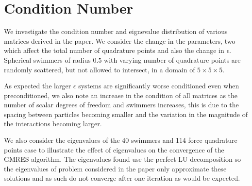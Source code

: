 \newpage
\FloatBarrier
\section{Condition Number}\label{appendix:ConNum}
We investigate the condition number and eignevalue distribution of various matrices derived in the paper. We consider the change in the parameters, two which affect the total number of quadrature points and also the change in $\epsilon$. Spherical swimmers of radius $0.5$ with varying number of quadrature points are randomly scattered, but not allowed to intersect, in a domain of $5 \times 5 \times 5$. 

As expected the larger $\epsilon$ systems are significantly worse conditioned even when preconditioned, we also note an increase in the condition of all matrices as the number of scalar degrees of freedom and swimmers increases, this is due to the spacing between particles becoming smaller and the variation in the magnitude of the interactions becoming larger. 

We also consider the eigenvalues of the 40 swimmers and 114 force quadrature points case to illustrate the effect of eigenvalues on the convergence of the GMRES algorithm. The eigenvalues found use the perfect LU decomposition so the eigenvalues of problem considered in the paper only approximate these solutions and as such do not converge after one iteration as would be expected. 

